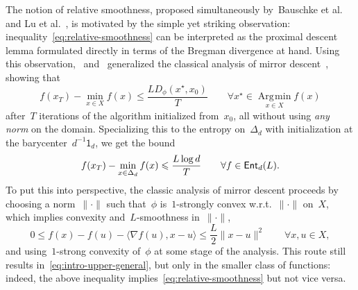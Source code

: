\documentclass[11pt]{article}
\numberwithin{equation}{section}
\let\le\leqslant
\theoremstyle{remark}
\newcommand{\ones}{\mathsf{1}_d}
\newcommand{\inner}[2]{\langle #1,#2\rangle}
\newcommand{\Ent}{\textup{\textsf{Ent}}}
\newcommand{\Fh}{\Ent_d}
\newcommand{\Simp}{\Delta_d}
\DeclareMathOperator*{\Argmin}{\operatorname{Arg}\!\min}
\newcommand{\1}{\mathbf{1}}
\newcommand{\bnabla}{\nabla}
\begin{document}
The notion of relative smoothness, proposed simultaneously by~Bauschke et al.~\cite{BauschkeBolteTeboulle2017} and Lu et al.~\cite{LuFreundNesterov2018}, is motivated by the simple yet striking observation: inequality~\eqref{eq:relative-smoothness} 
can be interpreted as the proximal descent lemma formulated directly in terms of the Bregman divergence at hand.
Using this observation,~\cite{BauschkeBolteTeboulle2017} and~\cite{LuFreundNesterov2018} generalized the classical analysis of mirror descent~\cite{nemirovski1983problem}, showing that
\begin{equation}
\label{eq:intro-upper-general}
f(x_T)- \min_{x \in X} f(x)\le \frac{LD_{\phi}(x^\star,x_0)}{T} \qquad \forall x^\star \in \Argmin\limits_{x \in X} f(x)
\end{equation}
after~$T$ iterations of the algorithm initialized from~$x_0$,  all without using {\em any norm} on the domain.
Specializing this to the entropy on~$\Simp$ with initialization at the barycenter~$d^{-1} \ones$, we get the bound
\begin{equation}
\label{eq:intro-upper-KL}
f(x_T)- \min_{x \in \Simp} f(x)\le \frac{L\log d}{T} \qquad \forall f \in \Fh(L).
\end{equation}
To put this into perspective, the classic analysis of mirror descent 
proceeds by choosing a norm~$\|\cdot\|$ such that~$\phi$ is~$1$-strongly convex w.r.t.~$\|\cdot\|$ on~$X$, 
which implies convexity and~$L$-smoothness in~$\|\cdot\|$,
\begin{equation*}
0 \le f(x) - f(u) - \inner{\bnabla f(u)}{x-u} \le \frac{L}{2} \|x-u\|^2
\qquad \forall x,u \in X,
\end{equation*}
and using~$1$-strong convexity of~$\phi$ at some stage of the analysis. 
This route still results in~\eqref{eq:intro-upper-general}, but only in the smaller class of functions: indeed, the above inequality implies~\eqref{eq:relative-smoothness} but not vice versa.
\end{document}
